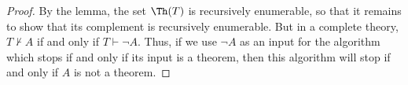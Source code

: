

\setcounter{section}{3}
\setcounter{subsection}{5}
\setcounter{dfn}{34}

\begin{proof}
By the lemma, the set $\Th(T)$ is recursively enumerable, so that it remains to show that its complement is recursively enumerable.
But in a complete theory, $T \not\vdash A$ if and only if $T \vdash \neg A$.
Thus, if we use $\neg A$ as an input for the algorithm which stops if and only if its input is a theorem, then this algorithm will stop if and only if
$A$ is not a theorem.
\end{proof}




